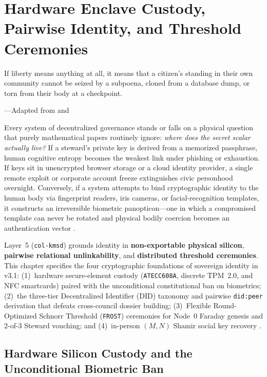 \chapter{Hardware Enclave Custody, Pairwise Identity, and Threshold Ceremonies}
\label{ch:l5-hardware-custody}

\epigraph{If liberty means anything at all, it means that a citizen's standing in their own community cannot be seized by a subpoena, cloned from a database dump, or torn from their body at a checkpoint.}{---Adapted from \textcite{arendt1963} and \textcite{naacp1958}}

Every system of decentralized governance stands or falls on a physical question that purely
mathematical papers routinely ignore: \textit{where does the secret scalar actually live?} If a
steward's private key is derived from a memorized passphrase, human cognitive entropy becomes
the weakest link under phishing or exhaustion. If keys sit in unencrypted browser storage or a
cloud identity provider, a single remote exploit or corporate account freeze extinguishes civic
personhood overnight. Conversely, if a system attempts to bind cryptographic identity to the
human body via fingerprint readers, iris cameras, or facial-recognition templates, it constructs
an irreversible biometric panopticon---one in which a compromised template can never be rotated
and physical bodily coercion becomes an authentication vector \parencite{zuboff2019}.

Layer~5 (\texttt{col-kmsd}) grounds identity in \textbf{non-exportable physical silicon}, \textbf{pairwise
relational unlinkability}, and \textbf{distributed threshold ceremonies}. This chapter specifies the
four cryptographic foundations of sovereign identity in v3.1: (1)~hardware secure-element
custody (\texttt{ATECC608A}, discrete TPM~2.0, and NFC smartcards) paired with the unconditional
constitutional ban on biometrics; (2)~the three-tier Decentralized Identifier (DID) taxonomy and
pairwise \texttt{did:peer} derivation that defeats cross-council dossier building; (3)~Flexible
Round-Optimized Schnorr Threshold (\texttt{FROST}) ceremonies \parencite{komlo2020frost} for
Node~0 Faraday genesis and 2-of-3 Steward vouching; and (4)~in-person $(M, N)$ Shamir social key
recovery \parencite{shamir1979}.

\section{Hardware Silicon Custody and the Unconditional Biometric Ban}
\label{sec:ch2-hardware-silicon}

